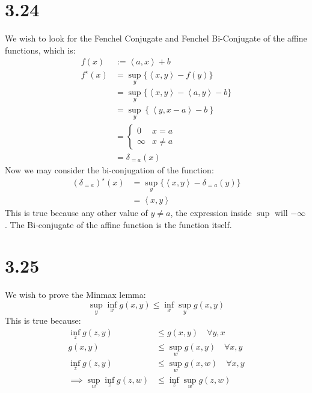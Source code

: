 \documentclass[]{article}
\begin{document}
\section*{3.24}
    We wish to look for the Fenchel Conjugate and Fenchel Bi-Conjugate of the affine functions, which is: 
    \begin{align*}\tag{3.24.1}\label{eqn:3.24.1}
        f(x) &:= \left\langle a, x \right\rangle + b
        \\
        f^\star(x) &= \sup_y \{\left\langle x, y \right\rangle - f(y)\}
        \\
        &= \sup_y \{
            \left\langle x, y \right\rangle   - \left\langle a, y \right\rangle - b
        \}
        \\
        &= 
        \sup_y \left\lbrace
            \left\langle y, x - a \right\rangle - b
        \right\rbrace
        \\
        &= \begin{cases}
            0 & x = a 
            \\
            \infty& x \neq a 
        \end{cases}
        \\
        &= \delta_{=a}(x)
    \end{align*}
    Now we may consider the bi-conjugation of the function: 
    \begin{align*}\tag{3.24.2}\label{eqn:3.24.2}
        (\delta_{=a})^\star(x) &= \sup_y \{
            \left\langle x, y \right\rangle - \delta_{=a}(y)
        \}
        \\
        &= \left\langle x, y \right\rangle
    \end{align*}
    This is true because any other value of $y\neq a$, the expression inside $\sup$ will $-\infty$. The Bi-conjugate of the affine function is the function itself. 
\section*{3.25}
    We wish to prove the Minmax lemma: 
    $$
        \sup_y\inf_x g(x, y) \le \inf_x\sup_y g(x,y)
    $$
    This is true because: 
    \begin{align*}\tag{3.25.1}\label{eqn:3.25.1}
        \inf_z g(z, y) &\le g(x, y) \quad \forall y, x
        \\
        g(x, y) &\le \sup_w g(x, y) \quad \forall x, y
        \\
        \inf_z g(z, y) &\le \sup_w g(x, w) \quad \forall x, y
        \\
        \implies
        \sup_w\inf_z g(z, w) &\le \inf_z \sup_w g(z, w)
    \end{align*}
\end{document}
